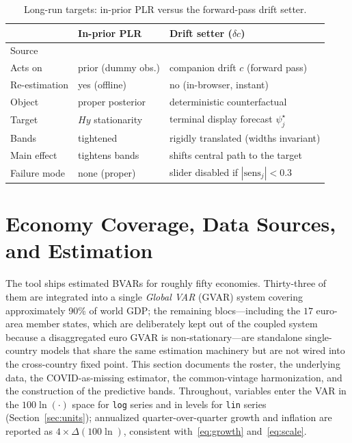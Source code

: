 \documentclass[11pt]{article}
\theoremstyle{definition}
\theoremstyle{remark}
\begin{document}
\begin{table}[H]
\centering
\caption{Long-run targets: in-prior PLR versus the forward-pass drift
setter.}\label{tab:plr-vs-tilt}
\begin{tabular}{lll}
\toprule
 & \textbf{In-prior PLR} & \textbf{Drift setter ($\delta c$)} \\
\midrule
Source        & \citet{GiannoneLenzaPrimiceri2019} & \citet{Villani2009} \\
Acts on       & prior (dummy obs.) & companion drift $c$ (forward pass) \\
Re-estimation & yes (offline) & no (in-browser, instant) \\
Object        & proper posterior & deterministic counterfactual \\
Target        & $Hy$ stationarity & terminal display forecast $\psi^\star_j$ \\
Bands         & tightened & rigidly translated (widths invariant) \\
Main effect   & tightens bands & shifts central path to the target \\
Failure mode  & none (proper) & slider disabled if $|\mathrm{sens}_j|<0.3$ \\
\bottomrule
\end{tabular}
\end{table}

\section{Economy Coverage, Data Sources, and Estimation}\label{sec:variables}

The tool ships estimated BVARs for roughly fifty economies. Thirty-three
of them are integrated into a single \emph{Global VAR} (GVAR) system
\citep{PesaranSchuermannWeiner2004, DeesDiMauroPesaranSmith2007}
covering approximately 90\% of world GDP; the remaining blocs---including the
$17$ euro-area member states, which are deliberately kept out of the coupled
system because a disaggregated euro GVAR is non-stationary---are
standalone single-country models that share the same estimation
machinery but are not wired into the cross-country fixed point.
This section documents the roster, the underlying data, the
COVID-as-missing estimator, the common-vintage harmonization, and the
construction of the predictive bands. Throughout, variables enter the
VAR in the $100\ln(\cdot)$ space for \texttt{log} series and in levels
for \texttt{lin} series (Section~\ref{sec:units}); annualized
quarter-over-quarter growth and inflation are reported as
$4\times\Delta(100\ln)$, consistent with~\eqref{eq:growth}
and~\eqref{eq:scale}.
\end{document}
